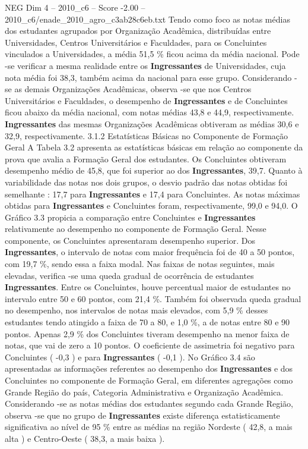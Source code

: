 \begin{textsample}{NEG Dim 4 – 2010\_c6 – Score -2.00 – 2010\_c6/enade\_2010\_agro\_c3ab28c6eb.txt}
Tendo como foco as notas médias dos estudantes agrupados por Organização Acadêmica, distribuídas entre Universidades, Centros Universitários e Faculdades, para os Concluintes vinculados a Universidades, a média 51,5 \% ficou acima da média nacional.
Pode -se verificar a mesma realidade entre os \textbf{Ingressantes} de Universidades, cuja nota média foi 38,3, também acima da nacional para esse grupo.
Considerando -se as demais Organizações Acadêmicas, observa -se que nos Centros Universitários e Faculdades, o desempenho de \textbf{Ingressantes} e de Concluintes ficou abaixo da média nacional, com notas médias 43,8 e 44,9, respectivamente. \textbf{Ingressantes} das mesmas Organizações Acadêmicas obtiveram as médias 30,6 e 32,9, respectivamente. 3.1.2 Estatísticas Básicas no Componente de Formação Geral A Tabela 3.2 apresenta as estatísticas básicas em relação ao componente da prova que avalia a Formação Geral dos estudantes.
Os Concluintes obtiveram desempenho médio de 45,8, que foi superior ao dos \textbf{Ingressantes}, 39,7.
Quanto à variabilidade das notas nos dois grupos, o desvio padrão das notas obtidas foi semelhante : 17,7 para \textbf{Ingressantes} e 17,4 para Concluintes.
As notas máximas obtidas para \textbf{Ingressantes} e Concluintes foram, respectivamente, 99,0 e 94,0.
O Gráfico 3.3 propicia a comparação entre Concluintes e \textbf{Ingressantes} relativamente ao desempenho no componente de Formação Geral.
Nesse componente, os Concluintes apresentaram desempenho superior.
Dos \textbf{Ingressantes}, o intervalo de notas com maior frequência foi de 40 a 50 pontos, com 19,7 \%, sendo essa a faixa modal.
Nas faixas de notas seguintes, mais elevadas, verifica -se uma queda gradual de ocorrência de estudantes \textbf{Ingressantes}.
Entre os Concluintes, houve percentual maior de estudantes no intervalo entre 50 e 60 pontos, com 21,4 \%.
Também foi observada queda gradual no desempenho, nos intervalos de notas mais elevados, com 5,9 \% desses estudantes tendo atingido a faixa de 70 a 80, e 1,0 \%, a de notas entre 80 e 90 pontos.
Apenas 2,9 \% dos Concluintes tiveram desempenho na menor faixa de notas, que vai de zero a 10 pontos.
O coeficiente de assimetria foi negativo para Concluintes ( -0,3 ) e para \textbf{Ingressantes} ( -0,1 ).
No Gráfico 3.4 são apresentadas as informações referentes ao desempenho dos \textbf{Ingressantes} e dos Concluintes no componente de Formação Geral, em diferentes agregações como Grande Região do país, Categoria Administrativa e Organização Acadêmica.
Considerando -se as notas médias dos estudantes segundo cada Grande Região, observa -se que no grupo de \textbf{Ingressantes} existe diferença estatisticamente significativa ao nível de 95 \% entre as médias na região Nordeste ( 42,8, a mais alta ) e Centro-Oeste ( 38,3, a mais baixa ).

\end{textsample}
